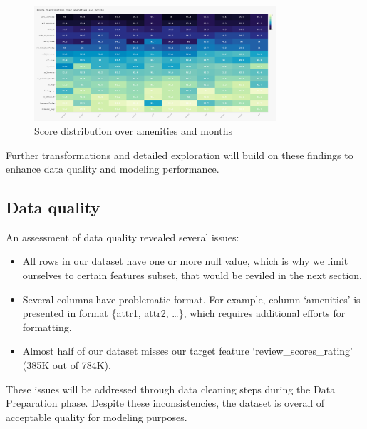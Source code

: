 \vspace{1em}
\begin{figure}[H]
    \centering
    \includegraphics[width=0.8\textwidth]{images/q7_1.jpg}
    \caption{Score distribution over amenities and months}\label{fig:figureq15}
\end{figure}


Further transformations and detailed exploration will build on these findings to enhance data quality and modeling performance.



\subsection{Data quality}\label{sec:dataQuality}
An assessment of data quality revealed several issues:

\begin{itemize}
    \item All rows in our dataset have one or more null value, which is why we limit ourselves to certain features subset, that would be reviled in the next section.
    \item Several columns have problematic format. For example, column `amenities' is presented in format \{attr1, attr2, \ldots \}, which requires additional efforts for formatting.
    \item Almost half of our dataset misses our target feature `review\_scores\_rating' (385K out of 784K).
\end{itemize}

These issues will be addressed through data cleaning steps during the Data Preparation phase. Despite these inconsistencies, the dataset is overall of acceptable quality for modeling purposes.
